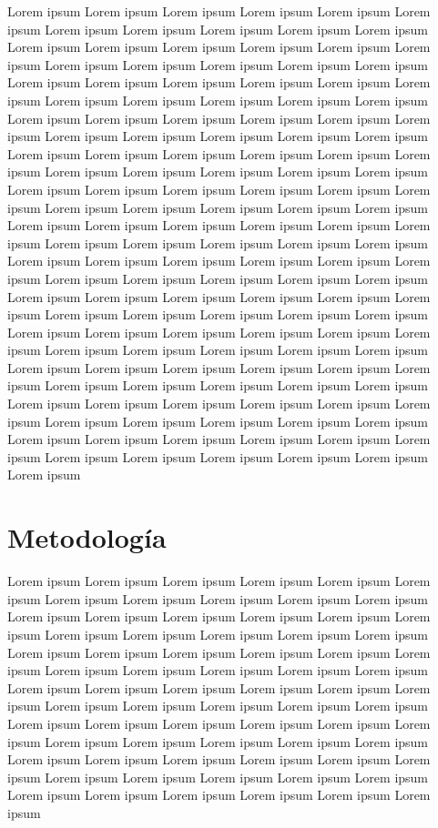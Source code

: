 \documentclass[12pt]{article}
\begin{document}
Lorem ipsum Lorem ipsum Lorem ipsum Lorem ipsum Lorem ipsum Lorem ipsum Lorem ipsum Lorem ipsum Lorem ipsum Lorem ipsum Lorem ipsum Lorem ipsum Lorem ipsum Lorem ipsum Lorem ipsum Lorem ipsum Lorem ipsum Lorem ipsum Lorem ipsum Lorem ipsum Lorem ipsum Lorem ipsum Lorem ipsum Lorem ipsum Lorem ipsum Lorem ipsum Lorem ipsum Lorem ipsum Lorem ipsum Lorem ipsum Lorem ipsum Lorem ipsum Lorem ipsum Lorem ipsum Lorem ipsum Lorem ipsum
Lorem ipsum Lorem ipsum Lorem ipsum Lorem ipsum Lorem ipsum Lorem ipsum Lorem ipsum Lorem ipsum Lorem ipsum Lorem ipsum Lorem ipsum Lorem ipsum Lorem ipsum Lorem ipsum Lorem ipsum Lorem ipsum Lorem ipsum Lorem ipsum Lorem ipsum Lorem ipsum Lorem ipsum Lorem ipsum Lorem ipsum Lorem ipsum Lorem ipsum Lorem ipsum Lorem ipsum Lorem ipsum Lorem ipsum Lorem ipsum Lorem ipsum Lorem ipsum Lorem ipsum Lorem ipsum Lorem ipsum Lorem ipsum
Lorem ipsum Lorem ipsum Lorem ipsum Lorem ipsum Lorem ipsum Lorem ipsum Lorem ipsum Lorem ipsum Lorem ipsum Lorem ipsum Lorem ipsum Lorem ipsum Lorem ipsum Lorem ipsum Lorem ipsum Lorem ipsum Lorem ipsum Lorem ipsum Lorem ipsum Lorem ipsum Lorem ipsum Lorem ipsum Lorem ipsum Lorem ipsum Lorem ipsum Lorem ipsum Lorem ipsum Lorem ipsum Lorem ipsum Lorem ipsum Lorem ipsum Lorem ipsum Lorem ipsum Lorem ipsum Lorem ipsum Lorem ipsum
Lorem ipsum Lorem ipsum Lorem ipsum Lorem ipsum Lorem ipsum Lorem ipsum Lorem ipsum Lorem ipsum Lorem ipsum Lorem ipsum Lorem ipsum Lorem ipsum Lorem ipsum Lorem ipsum Lorem ipsum Lorem ipsum Lorem ipsum Lorem ipsum Lorem ipsum Lorem ipsum Lorem ipsum Lorem ipsum Lorem ipsum Lorem ipsum Lorem ipsum Lorem ipsum Lorem ipsum Lorem ipsum Lorem ipsum Lorem ipsum Lorem ipsum Lorem ipsum Lorem ipsum Lorem ipsum Lorem ipsum Lorem ipsum

\section{Metodología}

Lorem ipsum Lorem ipsum Lorem ipsum Lorem ipsum Lorem ipsum Lorem ipsum Lorem ipsum Lorem ipsum Lorem ipsum Lorem ipsum Lorem ipsum Lorem ipsum Lorem ipsum Lorem ipsum Lorem ipsum Lorem ipsum Lorem ipsum Lorem ipsum Lorem ipsum Lorem ipsum Lorem ipsum Lorem ipsum Lorem ipsum Lorem ipsum Lorem ipsum Lorem ipsum Lorem ipsum Lorem ipsum Lorem ipsum Lorem ipsum Lorem ipsum Lorem ipsum Lorem ipsum Lorem ipsum Lorem ipsum Lorem ipsum
Lorem ipsum Lorem ipsum Lorem ipsum Lorem ipsum Lorem ipsum Lorem ipsum Lorem ipsum Lorem ipsum Lorem ipsum Lorem ipsum Lorem ipsum Lorem ipsum Lorem ipsum Lorem ipsum Lorem ipsum Lorem ipsum Lorem ipsum Lorem ipsum Lorem ipsum Lorem ipsum Lorem ipsum Lorem ipsum Lorem ipsum Lorem ipsum Lorem ipsum Lorem ipsum Lorem ipsum Lorem ipsum Lorem ipsum Lorem ipsum Lorem ipsum Lorem ipsum Lorem ipsum Lorem ipsum Lorem ipsum Lorem ipsum
\end{document}
